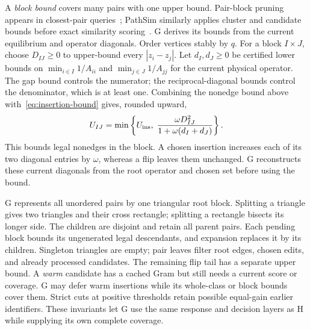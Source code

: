 A \emph{block bound} covers many pairs with one upper bound. Pair-block pruning appears in closest-pair queries~\cite{corral2000closestpair}; PathSim similarly applies cluster and candidate bounds before exact similarity scoring~\cite{sun2011pathsim}. G derives its bounds from the current equilibrium and operator diagonals. Order vertices stably by $q$. For a block $I\times J$, choose $D_{IJ}\ge0$ to upper-bound every $|z_i-z_j|$. Let $d_I,d_J\ge0$ be certified lower bounds on $\min_{i\in I}1/A_{ii}$ and $\min_{j\in J}1/A_{jj}$ for the current physical operator. The gap bound controls the numerator; the reciprocal-diagonal bounds control the denominator, which is at least one. Combining the nonedge bound above with~\eqref{eq:insertion-bound} gives, rounded upward,
\begin{equation}
 U_{IJ}=\min\left\{U_{\rm ins},\;
 \frac{\omega D_{IJ}^{2}}{1+\omega(d_I+d_J)}\right\}.
 \label{eq:block-insertion}
\end{equation}
This bounds legal nonedges in the block. A chosen insertion increases each of its two diagonal entries by $\omega$, whereas a flip leaves them unchanged. G reconstructs these current diagonals from the root operator and chosen set before using the bound.

G represents all unordered pairs by one triangular root block. Splitting a triangle gives two triangles and their cross rectangle; splitting a rectangle bisects its longer side. The children are disjoint and retain all parent pairs. Each pending block bounds its ungenerated legal descendants, and expansion replaces it by its children. Singleton triangles are empty; pair leaves filter root edges, chosen edits, and already processed candidates. The remaining flip tail has a separate upper bound. A \emph{warm} candidate has a cached Gram but still needs a current score or coverage. G may defer warm insertions while its whole-class or block bounds cover them. Strict cuts at positive thresholds retain possible equal-gain earlier identifiers. These invariants let G use the same response and decision layers as H while supplying its own complete coverage.

